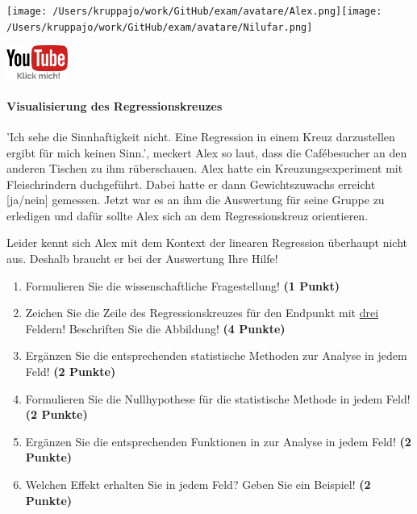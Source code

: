 \documentclass[a4paper, 9pt]{scrartcl}\usepackage[]{graphicx}\usepackage[]{xcolor}
\begin{document}
 
\ifcollection
\begin{flushright}
\tiny\vspace{-3Ex}
\textbf{\examinhaltstart}
\exammodulebiostat
\vspace{-4Ex}
\end{flushright}
\begin{minipage}[t]{0.5\textwidth}
\texttt{[image: /Users/kruppajo/work/GitHub/exam/avatare/Alex.png]}\hspace{-4mm}\texttt{[image: /Users/kruppajo/work/GitHub/exam/avatare/Nilufar.png]}
\end{minipage}
\begin{minipage}[t]{0.5\textwidth}
\hfill
\href{https://youtu.be/kHmfEmU6lrk}{\includegraphics[width = 2cm]{img/youtube}}
\end{minipage}
\fi



\ifcollection
\paragraph{Visualisierung des Regressionskreuzes}
\fi

'Ich sehe die Sinnhaftigkeit nicht. Eine Regression in einem Kreuz darzustellen ergibt für mich keinen Sinn.', meckert Alex so laut, dass die Cafébesucher an den anderen Tischen zu ihm rüberschauen. Alex hatte ein Kreuzungsexperiment mit Fleischrindern duchgeführt. Dabei hatte er dann Gewichtszuwachs erreicht [ja/nein] gemessen. Jetzt war es an ihm die Auswertung für seine Gruppe zu erledigen und dafür sollte Alex sich an dem Regressionskreuz orientieren.

\vspace{1Ex}

Leider kennt sich Alex mit dem Kontext der linearen Regression überhaupt nicht aus. Deshalb braucht er bei der Auswertung Ihre Hilfe!

\begin{enumerate}
  \item Formulieren Sie die wissenschaftliche Fragestellung! \textbf{(1 Punkt)}
\item Zeichen Sie die Zeile des Regressionskreuzes für den Endpunkt mit \underline{drei} Feldern! Beschriften Sie die Abbildung! \textbf{(4 Punkte)}
\item Ergänzen Sie die entsprechenden statistische Methoden zur Analyse in jedem Feld! \textbf{(2 Punkte)}
\item Formulieren Sie die Nullhypothese für die statistische Methode in jedem Feld! \textbf{(2 Punkte)}
\item Ergänzen Sie die entsprechenden Funktionen in \Rlogo zur Analyse in jedem Feld! \textbf{(2 Punkte)}
\item Welchen Effekt erhalten Sie in jedem Feld? Geben Sie ein Beispiel! \textbf{(2 Punkte)}
\end{enumerate} 
\clearpage
\end{document}
